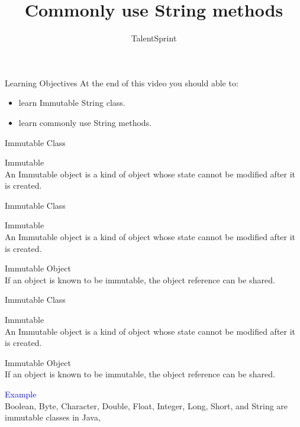 \documentclass[aspectratio=169,14pt,usenames,dvipsnames]{beamer}
\title[Commonly use String methods]{Commonly use String methods}
\begin{document}
{\1
\begin{frame} \vspace{35pt}

\subtitle{TalentSprint}
\maketitle
\end{frame}
}

\begin{frame}{Learning Objectives}
At the end of this video you should able to:
\begin{itemize}
\item learn Immutable String class.
\item learn commonly use String methods.
\end{itemize}
\end{frame}

\begin{frame}{Immutable Class}
\begin{block}{Immutable}\\
\vspace{0.8em}
An Immutable object is a kind of object whose state
cannot be modified after it is created.
\end{block}
\end{frame}

\begin{frame}{Immutable Class}
\begin{block}{Immutable}\\
An Immutable object is a kind of object whose state
cannot be modified after it is created.
\end{block}
\vspace{0.8em}
\begin{block}{Immutable Object }\\
If an object is known to be immutable, the object
reference can be shared.
\end{block}
\end{frame}

\begin{frame}{Immutable Class}
\begin{block}{Immutable}\\
An Immutable object is a kind of object whose state
cannot be modified after it is created.
\end{block}
\begin{block}{Immutable Object }\\
If an object is known to be immutable, the object
reference can be shared.
\end{block}
\begin{block}{\textcolor{blue}{Example}}\\
Boolean, Byte, Character, Double, Float, Integer, Long,
Short, and String are immutable classes in Java,
\end{block}
\end{frame}
\end{document}
